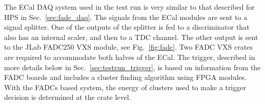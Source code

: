 The ECal DAQ system used in the test run is very similar to that described for HPS in Sec.~\ref{sec:fadc_daq}. 
The signals from the ECal modules are sent to a signal splitter. One of the outputs of the splitter is fed to a 
discriminator that also has an internal scaler, and then to a TDC channel. The other output is sent to the 
JLab FADC250 VXS module, see Fig.~\ref{fig:fadc}. Two FADC VXS crates are required to 
accommodate both halves of the ECal. The trigger, described in more details below in 
Sec.~\ref{sec:testrun_trigger}, is based on information from the FADC boards and includes a cluster 
finding algorithm using FPGA modules. With the FADCs based system, the energy of clusters used to 
make a trigger decision is determined at the crate level. 
